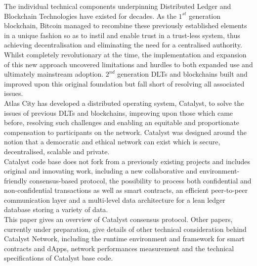 The individual technical components underpinning Distributed Ledger and Blockchain Technologies have existed for decades. As the $1^{st}$ generation blockchain, Bitcoin managed to recombine these previously established elements in a unique fashion so as to instil and enable trust in a trust-less system, thus achieving decentralisation and eliminating the need for a centralised authority. Whilst completely revolutionary at the time, the implementation and expansion of this new approach uncovered limitations and hurdles to both expanded use and ultimately mainstream adoption. $2^{nd}$ generation DLTs and blockchains built and improved upon this original foundation but fall short of resolving all associated issues. \\
 
Atlas City has developed a distributed operating system, Catalyst, to solve the issues of previous DLTs and blockchains, improving upon those which came before, resolving such challenges and enabling an equitable and proportionate compensation to participants on the network. Catalyst was designed around the notion that a democratic and ethical network can exist which is secure, decentralised, scalable and private.  \\
 
Catalyst code base does not fork from a previously existing projects and includes original and innovating work, including a new collaborative and environment-friendly consensus-based protocol, the possibility to process both confidential and non-confidential transactions as well as smart contracts, an efficient peer-to-peer communication layer and a multi-level data architecture for a lean ledger database storing a variety of data.\\
 
This paper gives an overview of Catalyst consensus protocol. Other papers, currently under preparation, give details of other technical consideration behind Catalyst Network, including the runtime environment and framework for smart contracts and dApps, network performances measurement and the technical specifications of Catalyst base code. 

